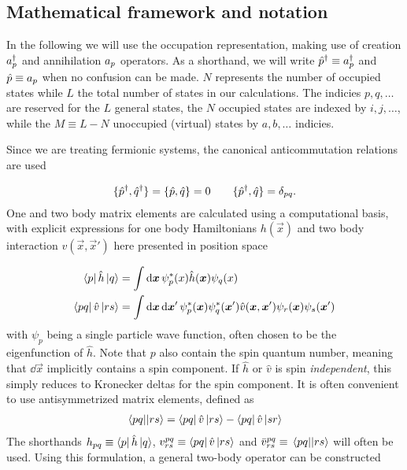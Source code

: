 \subsection{Mathematical framework and notation}
In the following we will use the occupation representation, making use of creation $a^{\dagger}_{p}$ and annihilation $a_{p}$ operators. As a shorthand, we will write $\hat{p}^{\dagger} \equiv a^{\dagger}_{p}$ and $\hat{p} \equiv a_{p}$ when no confusion can be made. $N$ represents the number of occupied states while $L$ the total number of states in our calculations. The indicies $p,q,\ldots$ are reserved for the $L$ general states, the $N$ occupied states are indexed by $i,j,\ldots$, while the $M \equiv L-N$ unoccupied (virtual) states by $a,b,\ldots$ indicies.

Since we are treating fermionic systems, the canonical anticommutation relations are used

\begin{align*}
    \set{\crt{p},\crt{q}} = \set{\ani{p},\ani{q}} = 0 \hspace{20px} \set{\crt{p},\ani{q}} = \delta_{pq}.
\end{align*}
One and two body matrix elements are calculated using a computational basis, with explicit expressions for one body Hamiltonians $h(\vec{x})$ and two body interaction $v(\vec{x}, \vec{x}')$ here presented in position space

\begin{align*}
    \bra{p}\hat{h}\ket{q} &= \int \dd{\boldsymbol{x}} \psi_p^*(x) \hat{h}(\boldsymbol{x}) \psi_q(x) \\
    \bra{pq}\hat{v}\ket{rs} &= \int \dd{\boldsymbol{x}}\dd{\boldsymbol{x}'} \psi_p^*(\boldsymbol{x})\psi_q^*(\boldsymbol{x}') \hat{v}(\boldsymbol{x},\boldsymbol{x}') \psi_r(\boldsymbol{x})\psi_s(\boldsymbol{x}')
\end{align*}
with $\psi_p$ being a single particle wave function, often chosen to be the eigenfunction of $\hat{h}$. Note that $p$ also contain the spin quantum number, meaning that $\dd \vec{x}$ implicitly contains a spin component. If $\hat{h}$ or $\hat{v}$ is spin \textit{independent}, this simply reduces to Kronecker deltas for the spin component. It is often convenient to use antisymmetrized matrix elements, defined as 
\begin{align*}
    \mel{pq}{}{rs} = \bra{pq}\hat{v}\ket{rs} - \bra{pq}\hat{v}\ket{sr}
\end{align*}
The shorthands $h_{pq} \equiv \bra{p} \hat{h} \ket{q}$, $v^{pq}_{rs} \equiv \bra{pq}\hat{v}\ket{rs}$ and $\bar{v}^{pq}_{rs} \equiv \mel{pq}{}{rs}$ will often be used. Using this formulation, a general two-body operator can be constructed

